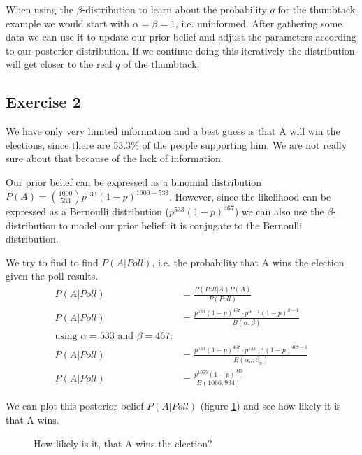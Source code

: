 \bigskip

When using the $\beta$-distribution to learn about the probability $q$ for the thumbtack example we would start with $\alpha=\beta=1$, i.e. uninformed. After gathering some data we can use it to update our prior belief and adjust the parameters according to our posterior distribution. If we continue doing this iteratively the distribution will get closer to the real $q$ of the thumbtack.


\subsection*{Exercise 2}
We have only very limited information and a best guess is that A will win the elections, since there are 53.3\% of the people supporting him. We are not really sure about that because of the lack of information.

Our prior belief can be expressed as a binomial distribution $P(A) = \binom{1000}{533} p^{533}(1-p)^{1000-533}$. However, since the likelihood can be expressed as a Bernoulli distribution ($p^{533}(1-p)^{467}$) we can also use the $\beta$-distribution to model our prior belief: it is conjugate to the Bernoulli distribution. 

We try to find to find $P(A|Poll)$, i.e. the probability that A wins the election given the poll results.
\begin{align*}
P(A|Poll) &= \frac{P(Poll|A)P(A)}{P(Poll)}\\
P(A|Poll) &= \frac{p^{533}(1-p)^{467} \cdot p^{\alpha-1}(1-p)^{\beta-1}}{B(\alpha,\beta)}\\
\text{using $\alpha=533$ and $\beta=467$:}\\
P(A|Poll) &= \frac{p^{533}(1-p)^{467} \cdot p^{533-1}(1-p)^{467-1}}{B(\alpha_n,\beta_n)}\\
P(A|Poll) &= \frac{p^{1065}(1-p)^{933}}{B(1066,934)}
\end{align*}

We can plot this posterior belief $P(A|Poll)$ (figure \ref{fig:2014-05-30_ex2pdf}) and see how likely it is that A wins.
\begin{figure}[!ht]
\centering
{}
\caption{How likely is it, that A wins the election?}
\label{fig:2014-05-30_ex2pdf}
\end{figure}


